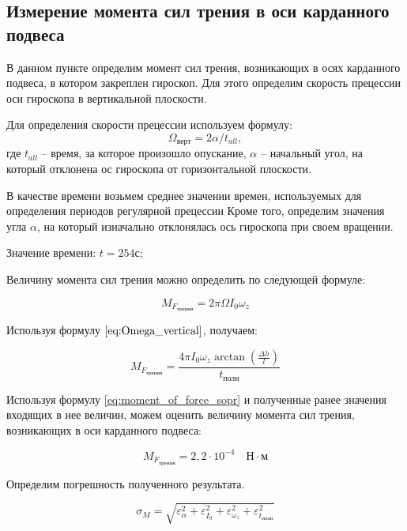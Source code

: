 \documentclass[12pt,a4paper]{article}
\begin{document}
\subsection{Измерение момента сил трения в оси карданного подвеса}
В данном пункте определим момент сил трения, возникающих в осях карданного подвеса, в котором закреплен гироскоп.
Для этого определим скорость прецессии оси гироскопа в вертикальной плоскости. 

Для определения скорости прецессии используем формулу:
\begin{equation}
	\Omega_{\text{верт}} = 2\alpha/t_{all},
	\label{eq:Omega_vertical}
\end{equation}
где $t_{all}$ -- время, за которое произошло опускание, $\alpha$ -- начальный угол, на который отклонена ос гироскопа от горизонтальной плоскости.

В качестве времени возьмем среднее значении времен, используемых для определения периодов регулярной прецессии
Кроме того, определим значения угла $\alpha$, на который изначально отклонялась ось гироскопа при своем вращении.

Значение времени: $t = 254 $с;

Величину момента сил трения можно определить по следующей формуле:

\begin{equation}
	M_{F_{\text{трения}}} = 2\pi\Omega I_{0}\omega_{z}
\end{equation}

Используя формулу $\ref{eq:Omega_vertical}$, получаем:

\begin{equation}
	M_{F_{\text{трения}}} = \frac{4\pi I_{0}\omega_{z}\arctan\left(\frac{\Delta h}{l}\right)}{t_{\text{полн}}}
	\label{eq:moment_of_force_sopr}
\end{equation}

Используя формулу \ref{eq:moment_of_force_sopr} и полученные ранее значения входящих в нее величин, можем оценить величину момента сил трения, возникающих в оси карданного подвеса:

\begin{equation}
	M_{F_{\text{трения}}} = 2,2 \cdot 10^{-4} \quad\text{Н}\cdot\text{м}
\end{equation}

Определим погрешность полученного результата. 

\begin{equation}
	\sigma_{M} = \sqrt{\varepsilon_{\alpha}^{2} + \varepsilon_{I_{0}}^{2} + \varepsilon_{\omega_{z}}^{2} + \varepsilon_{t_{\text{полн}}}^{2}}
\end{equation}
\end{document}
